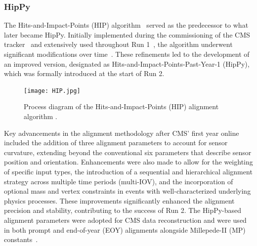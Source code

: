 


\subsubsection{HipPy}

The Hits-and-Impact-Points (HIP) algorithm~\cite{Karimaki:2003bd, Karimaki:926537} served as the predecessor to what later became HipPy. Initially implemented during the commissioning of the CMS tracker~\cite{WAdam_2009} and extensively used throughout Run 1~\cite{CMSCollaboration_2010, Chatrchyan:1667597}, the algorithm underwent significant modifications over time~\cite{BROWN2009467}. These refinements led to the development of an improved version, designated as Hits-and-Impact-Points-Past-Year-1 (HipPy), which was formally introduced at the start of Run 2. 

\begin{figure}[!hbt]
    \begin{center}
        \texttt{[image: HIP.jpg]}
        \caption{Process diagram of the Hits-and-Impact-Points (HIP) alignment algorithm \cite{2022166795}.}
        \label{fig:HIP}
    \end{center}
\end{figure}

Key advancements in the alignment methodology after CMS' first year online included the addition of three alignment parameters to account for sensor curvature, extending beyond the conventional six parameters that describe sensor position and orientation. Enhancements were also made to allow for the weighting of specific input types, the introduction of a sequential and hierarchical alignment strategy across multiple time periods (multi-IOV), and the incorporation of optional mass and vertex constraints in events with well-characterized underlying physics processes. These improvements significantly enhanced the alignment precision and stability, contributing to the success of Run 2. The HipPy-based alignment parameters were adopted for CMS data reconstruction and were used in both prompt and end-of-year (EOY) alignments alongside Millepede-II (MP) constants~\cite{BROWN2009467}. 

